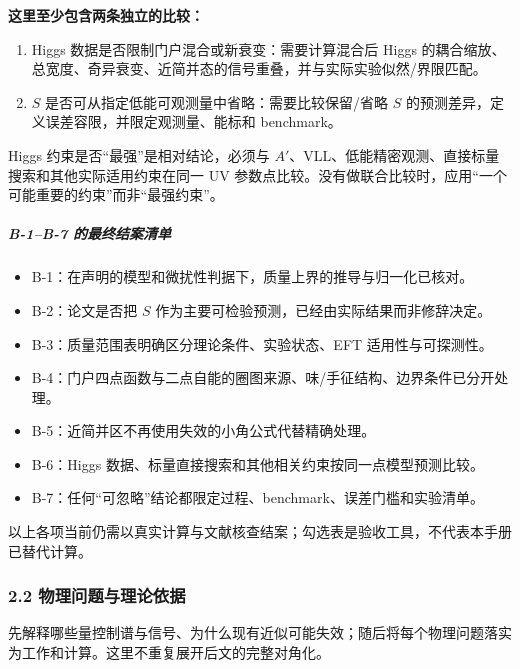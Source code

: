 \documentclass[
]{article}
\providecommand{\tightlist}{%
  \setlength{\itemsep}{0pt}\setlength{\parskip}{0pt}}
\begin{document}
\textbf{这里至少包含两条独立的比较：}

\begin{enumerate}
\def\labelenumi{\arabic{enumi}.}
\tightlist
\item
  Higgs 数据是否限制门户混合或新衰变：需要计算混合后 Higgs
  的耦合缩放、总宽度、奇异衰变、近简并态的信号重叠，并与实际实验似然/界限匹配。
\item
  \(S\) 是否可从指定低能可观测量中省略：需要比较保留/省略 \(S\)
  的预测差异，定义误差容限，并限定观测量、能标和 benchmark。
\end{enumerate}

Higgs 约束是否``最强''是相对结论，必须与
\(A'\)、VLL、低能精密观测、直接标量搜索和其他实际适用约束在同一 UV
参数点比较。没有做联合比较时，应用``一个可能重要的约束''而非``最强约束''。

\subparagraph{B-1--B-7
的最终结案清单}\label{b-1b-7-ux7684ux6700ux7ec8ux7ed3ux6848ux6e05ux5355}

\begin{itemize}
\tightlist
\item[$\square$]
  B-1：在声明的模型和微扰性判据下，质量上界的推导与归一化已核对。
\item[$\square$]
  B-2：论文是否把 \(S\) 作为主要可检验预测，已经由实际结果而非修辞决定。
\item[$\square$]
  B-3：质量范围表明确区分理论条件、实验状态、EFT 适用性与可探测性。
\item[$\square$]
  B-4：门户四点函数与二点自能的圈图来源、味/手征结构、边界条件已分开处理。
\item[$\square$]
  B-5：近简并区不再使用失效的小角公式代替精确处理。
\item[$\square$]
  B-6：Higgs 数据、标量直接搜索和其他相关约束按同一点模型预测比较。
\item[$\square$]
  B-7：任何``可忽略''结论都限定过程、benchmark、误差门槛和实验清单。
\end{itemize}

以上各项当前仍需以真实计算与文献核查结案；勾选表是验收工具，不代表本手册已替代计算。

\subsubsection{2.2
物理问题与理论依据}\label{ux7269ux7406ux95eeux9898ux4e0eux7406ux8bbaux4f9dux636e}

先解释哪些量控制谱与信号、为什么现有近似可能失效；随后将每个物理问题落实为工作和计算。这里不重复展开后文的完整对角化。
\end{document}
